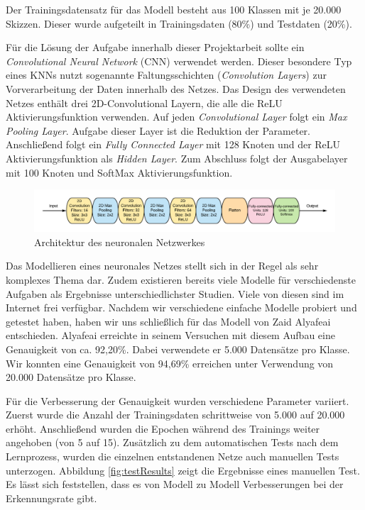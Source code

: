 \documentclass[11pt]{article}
\begin{document}
Der Trainingsdatensatz für das Modell besteht aus 100 Klassen mit je 20.000 Skizzen. Dieser wurde aufgeteilt in Trainingsdaten (80\%) und Testdaten (20\%).

Für die Lösung der Aufgabe innerhalb dieser Projektarbeit sollte  ein \textit{Convolutional Neural Network} (CNN) verwendet werden. Dieser besondere Typ eines KNNs nutzt sogenannte Faltungsschichten (\textit{Convolution Layers}) zur Vorverarbeitung der Daten innerhalb des Netzes.
Das Design des verwendeten Netzes enthält drei 2D-Convolutional Layern, die alle die ReLU Aktivierungsfunktion verwenden. Auf jeden \textit{Convolutional Layer} folgt ein \textit{Max Pooling Layer}. Aufgabe dieser Layer ist die Reduktion der Parameter. Anschließend folgt ein \textit{Fully Connected Layer} mit 128 Knoten und der ReLU Aktivierungsfunktion als \textit{Hidden Layer}. Zum Abschluss folgt der Ausgabelayer mit 100 Knoten und SoftMax Aktivierungsfunktion.

\begin{figure}[ht]
\centering
\includegraphics[width=1\textwidth]{images/NetworkArchitecture1.png}
\caption{\label{fig:classDiagram}Architektur des neuronalen Netzwerkes}
\end{figure}

Das Modellieren eines neuronales Netzes stellt sich in der Regel als sehr komplexes Thema dar. Zudem existieren bereits viele Modelle für verschiedenste Aufgaben als Ergebnisse unterschiedlichster Studien. Viele von diesen sind im Internet frei verfügbar. Nachdem wir verschiedene einfache Modelle probiert und getestet haben, haben wir uns schließlich für das Modell von Zaid Alyafeai\parencite{ZaidAlyafeai2018} entschieden. Alyafeai erreichte in seinem Versuchen mit diesem Aufbau eine Genauigkeit von ca. 92,20\%. Dabei verwendete er 5.000 Datensätze pro Klasse. Wir konnten eine Genauigkeit von   94,69\% erreichen unter Verwendung von 20.000 Datensätze pro Klasse.

Für die Verbesserung der Genauigkeit wurden verschiedene Parameter variiert. Zuerst wurde die Anzahl der Trainingsdaten schrittweise von 5.000 auf 20.000 erhöht. Anschließend wurden die Epochen während des Trainings weiter angehoben (von 5 auf 15). 
Zusätzlich zu dem automatischen Tests nach dem Lernprozess, wurden die einzelnen entstandenen Netze auch manuellen Tests unterzogen. Abbildung \ref{fig:testResults} zeigt die Ergebnisse eines manuellen Test. Es lässt sich feststellen, dass es von Modell zu Modell Verbesserungen bei der Erkennungsrate gibt.
\end{document}
